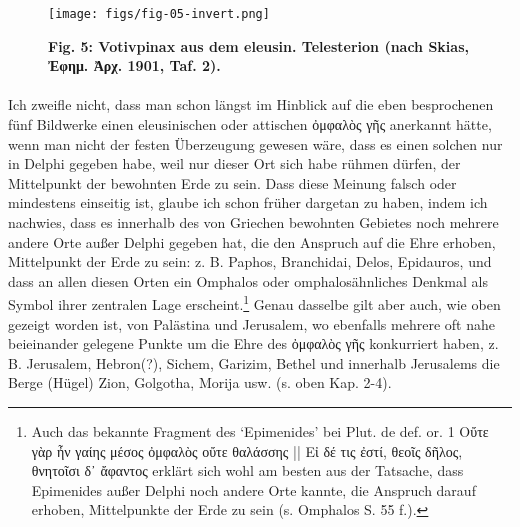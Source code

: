 \documentclass[a4paper, 11pt, oneside]{article}
\begin{document}
\begin{figure}[H]
\centering
\texttt{[image: figs/fig-05-invert.png]}
\caption{\bfseries Fig. 5: Votivpinax aus dem eleusin. Telesterion (nach Skias, Ἐφημ. Ἀρχ. 1901, Taf. 2).}
\end{figure}
\paragraph{}
Ich zweifle nicht, dass man schon längst im Hinblick auf die eben besprochenen fünf Bildwerke einen eleusinischen oder attischen ὀμφαλὸς γῆς anerkannt hätte, wenn man nicht der festen Überzeugung gewesen wäre, dass es einen solchen nur in Delphi gegeben habe, weil nur dieser Ort sich habe rühmen dürfen, der Mittelpunkt der bewohnten Erde zu sein. Dass diese Meinung falsch oder mindestens einseitig ist, glaube ich schon früher dargetan zu haben, indem ich nachwies, dass es innerhalb des von Griechen bewohnten Gebietes noch mehrere andere Orte außer Delphi gegeben hat, die den Anspruch auf die Ehre erhoben, Mittelpunkt der Erde zu sein: z. B. Paphos, Branchidai, Delos, Epidauros, und dass an allen diesen Orten ein Omphalos oder omphalosähnliches Denkmal als Symbol ihrer zentralen Lage erscheint.\footnote{Auch das bekannte Fragment des `Epimenides' bei Plut. de def. or. 1 Οὔτε γὰρ ἦν γαίης μέσος ὀμφαλὸς οὔτε θαλάσσης || Εἰ δέ τις ἐστί, θεοῖς δῆλος, θνητοῖσι δ᾽ ἄφαντος erklärt sich wohl am besten aus der Tatsache, dass Epimenides außer Delphi noch andere Orte kannte, die Anspruch darauf erhoben, Mittelpunkte der Erde zu sein (s. Omphalos S. 55 f.).} Genau dasselbe gilt aber auch, wie oben gezeigt worden ist, von Palästina und Jerusalem, wo ebenfalls mehrere oft nahe beieinander gelegene Punkte um die Ehre des ὀμφαλὸς γῆς konkurriert haben, z. B. Jerusalem, Hebron(?), Sichem, Garizim, Bethel und innerhalb Jerusalems die Berge (Hügel) Zion, Golgotha, Morija usw. (s. oben Kap. 2-4).
\end{document}
